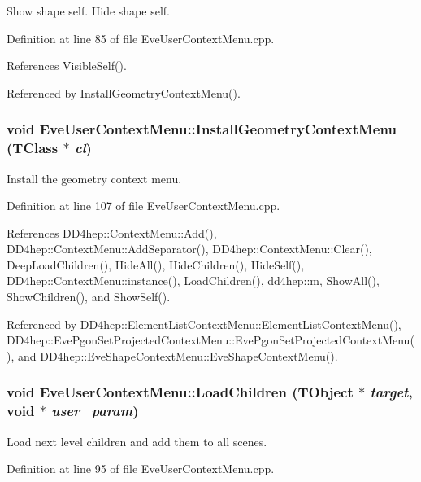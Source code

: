 Show shape self. Hide shape self. 

Definition at line 85 of file EveUserContextMenu.cpp.

References VisibleSelf().

Referenced by InstallGeometryContextMenu().\hypertarget{class_d_d4hep_1_1_eve_user_context_menu_a659b7acc26b0a8812cb688149d44a20d}{
\subsubsection[{InstallGeometryContextMenu}]{\setlength{\rightskip}{0pt plus 5cm}void EveUserContextMenu::InstallGeometryContextMenu (TClass $\ast$ {\em cl})}}
\label{class_d_d4hep_1_1_eve_user_context_menu_a659b7acc26b0a8812cb688149d44a20d}


Install the geometry context menu. 

Definition at line 107 of file EveUserContextMenu.cpp.

References DD4hep::ContextMenu::Add(), DD4hep::ContextMenu::AddSeparator(), DD4hep::ContextMenu::Clear(), DeepLoadChildren(), HideAll(), HideChildren(), HideSelf(), DD4hep::ContextMenu::instance(), LoadChildren(), dd4hep::m, ShowAll(), ShowChildren(), and ShowSelf().

Referenced by DD4hep::ElementListContextMenu::ElementListContextMenu(), DD4hep::EvePgonSetProjectedContextMenu::EvePgonSetProjectedContextMenu(), and DD4hep::EveShapeContextMenu::EveShapeContextMenu().\hypertarget{class_d_d4hep_1_1_eve_user_context_menu_a79e2490b2f169394ea18c19c3271e195}{
\subsubsection[{LoadChildren}]{\setlength{\rightskip}{0pt plus 5cm}void EveUserContextMenu::LoadChildren ({\bf TObject} $\ast$ {\em target}, \/  void $\ast$ {\em user\_\-param})}}
\label{class_d_d4hep_1_1_eve_user_context_menu_a79e2490b2f169394ea18c19c3271e195}


Load next level children and add them to all scenes. 

Definition at line 95 of file EveUserContextMenu.cpp.

